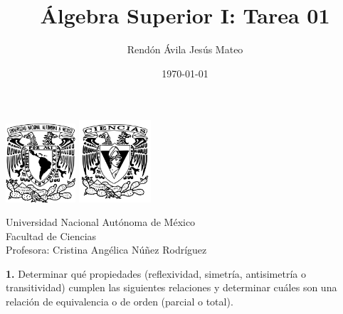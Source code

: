 \documentclass[12pt]{article}
\title{\textbf{Álgebra Superior I: Tarea 01}}
\author{Rendón Ávila Jesús Mateo}
\date{\today}
\begin{document}
\maketitle
\begin{center}
\vspace{3cm}
\includegraphics[width=0.195\textwidth]{Escudo.png}
\hspace{0.5cm}
\includegraphics[width=0.2\textwidth]{logo_ciencias.png}
\end{center}
\begin{center}
    \vspace{1cm}
    Universidad Nacional Autónoma de México\\
    Facultad de Ciencias\\
    Profesora: Cristina Angélica Núñez Rodríguez\\
\end{center}

\newpage

%
%
\textbf{1.} Determinar qué propiedades (reflexividad, simetría, antisimetría o transitividad) cumplen las siguientes
relaciones y determinar cuáles son una relación de equivalencia o de orden (parcial o total).
\end{document}
